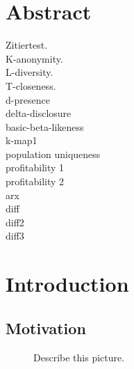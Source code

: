 \documentclass[12pt, a4paper,oneside]{report}
\begin{document}


\setcounter{tocdepth}{10}
\tableofcontents






\listoffigures
\listoftables

\titleformat{\chapter}{\LARGE\bfseries}{\thechapter}{1em}{}




\chapter*{Abstract}

Zitiertest\cite{Gerl2018}.\\
K-anonymity\cite{SWEENEY2002}.\\
L-diversity\cite{Machanavajjhala2006}.\\
T-closeness\cite{Li2007}.\\
d-presence\cite{Nergiz2007}\\
delta-disclosure\cite{Brickell2008}\\
basic-beta-likeness\cite{Cao2012}\\
k-map1\cite{Emam2008}\\
population uniqueness\cite{Dankar2012}\\
profitability 1\cite{Wan}\\
profitability 2\cite{Prasser2017}\\
arx\cite{arx}\\
diff\cite{Dwork2006}\\
diff2\cite{Bild2018}\\
diff3\cite{Li2012}\\

\newpage
\chapter{Introduction}

\section{Motivation}

\begin{figure}[!ht]
	\centering
	\caption{Describe this picture.}
	\label{fig:1}
\end{figure}
\end{document}
